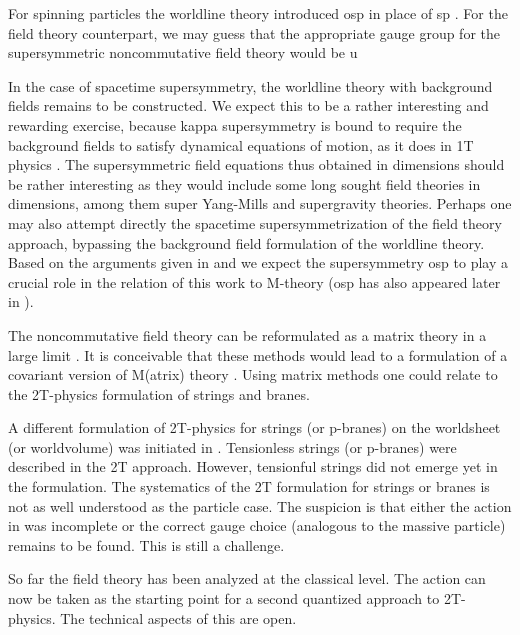 \documentclass[a4paper,12pt]{article}
\begin{document}
For spinning particles the worldline theory introduced osp\coordHE{} in place of sp\coordHE{} \cite{spin2t}. For the field theory
counterpart, we may guess that the appropriate gauge group for the
supersymmetric noncommutative field theory would be u\coordHE{}

In the case of spacetime supersymmetry, the worldline theory with
background fields remains to be constructed. We expect this to be
a rather interesting and rewarding exercise, because kappa
supersymmetry is bound to require the background fields to satisfy
dynamical equations of motion, as it does in 1T physics
\cite{wittsusy}. The supersymmetric field equations thus obtained
in \coordHE{} dimensions should be rather interesting as they would
include some long sought field theories in \coordHE{} dimensions, among
them super Yang-Mills and supergravity theories. Perhaps one may
also attempt directly the spacetime supersymmetrization of the
field theory approach, bypassing the background field formulation
of the worldline theory. Based on the arguments given in
\cite{super2t}\cite{survey2T} and \cite{S-theory} we expect the
supersymmetry osp\coordHE{} to play a crucial role in
the relation of this work to M-theory (osp\coordHE{}
has also appeared later in \cite{west}\cite{ferrara}).

The noncommutative field theory can be reformulated as a matrix theory in a
large \coordHE{} limit \cite{NCu11}. It is conceivable that these methods would
lead to a formulation of a covariant version of M(atrix) theory \cite{BFSS}.
Using matrix methods one could relate to the 2T-physics formulation of
strings and branes.

A different formulation of 2T-physics for strings (or p-branes) on
the worldsheet (or worldvolume) was initiated in \cite{string2t}.
Tensionless strings (or p-branes) were described in the 2T
approach. However, tensionful strings did not emerge yet in the
formulation. The systematics of the 2T formulation for strings or
branes is not as well understood as the particle case. The
suspicion is that either the action in \cite{string2t} was
incomplete or the correct gauge choice (analogous to the massive
particle) remains to be found. This is still a challenge.

So far the field theory has been analyzed at the classical level. The action
can now be taken as the starting point for a second quantized approach to
2T-physics. The technical aspects of this are open.
\end{document}
